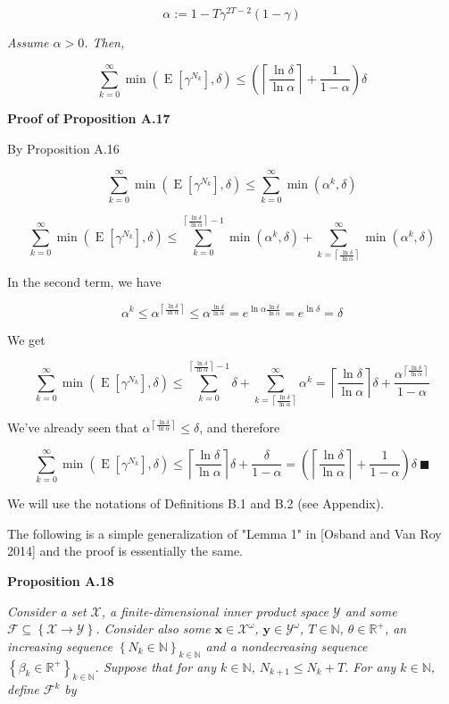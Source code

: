 \documentclass[a4paper]{article}
\newcommand{\Co}[1]{}
\newcommand{\San}[1]{}
\newcommand{\AP}[1]{\left(#1\right)}
\newcommand{\AB}[1]{\left[#1\right]}
\newcommand{\AC}[1]{\left\{#1\right\}}
\newcommand{\Ceil}[1]{\left\lceil #1 \right\rceil}
\newcommand{\E}[1]{\operatorname{E}\AB{#1}}
\newcommand{\Nats}{\mathbb{N}}
\newcommand{\Reals}{\mathbb{R}}
\newcommand{\X}{\mathcal{X}}
\newcommand{\Y}{\mathcal{Y}}
\newcommand{\F}{\mathcal{F}}
\begin{document}
$$\alpha:=1-T\gamma^{2T-2}(1-\gamma)$$

\textit{Assume $\alpha>0$. Then,}\Co{i}

$$\sum_{k=0}^\infty\min\AP{\E{\gamma^{N_k}},\delta}\leq\AP{\Ceil{\frac{\ln\delta}{\ln\alpha}}+\frac{1}{1-\alpha}}\delta$$

\textbf{Proof of Proposition A.17}\Co{b}

By Proposition A.16

$$\sum_{k=0}^\infty\min\AP{\E{\gamma^{N_k}},\delta}\leq\sum_{k=0}^\infty\min\AP{\alpha^k,\delta}$$

$$\sum_{k=0}^\infty\min\AP{\E{\gamma^{N_k}},\delta}\leq\sum_{k=0}^{\Ceil{\frac{\ln\delta}{\ln\alpha}}-1}\min\AP{\alpha^k,\delta}+\sum_{k=\Ceil{\frac{\ln\delta}{\ln\alpha}}}^\infty\min\AP{\alpha^k,\delta}$$

In the second term, we have

$$\alpha^k\leq\alpha^{\Ceil{\frac{\ln\delta}{\ln\alpha}}}\leq\alpha^{\frac{\ln\delta}{\ln\alpha}}=e^{\ln\alpha\frac{\ln\delta}{\ln\alpha}}=e^{\ln\delta}=\delta$$

We get

$$\sum_{k=0}^\infty\min\AP{\E{\gamma^{N_k}},\delta}\leq\sum_{k=0}^{\Ceil{\frac{\ln\delta}{\ln\alpha}}-1}\delta+\sum_{k=\Ceil{\frac{\ln\delta}{\ln\alpha}}}^\infty\alpha^k=\Ceil{\frac{\ln\delta}{\ln\alpha}}\delta+\frac{\alpha^{\Ceil{\frac{\ln\delta}{\ln\alpha}}}}{1-\alpha}$$

We've already seen that $\alpha^{\Ceil{\frac{\ln\delta}{\ln\alpha}}}\leq\delta$, and therefore

$$\sum_{k=0}^\infty\min\AP{\E{\gamma^{N_k}},\delta}\leq\Ceil{\frac{\ln\delta}{\ln\alpha}}\delta+\frac{\delta}{1-\alpha}=\AP{\Ceil{\frac{\ln\delta}{\ln\alpha}}+\frac{1}{1-\alpha}}\delta\ \blacksquare$$

We will use the notations of Definitions B.1 and B.2 (see Appendix).

The following is a simple generalization of "Lemma 1" in [Osband and Van Roy 2014]\San{(https://arxiv.org/abs/1406.1853)} and the proof is essentially the same.

\textbf{Proposition A.18}\Co{b}

\textit{Consider a set $\X$, a finite-dimensional inner product space $\Y$ and some $\F\subseteq\AC{\X\rightarrow\Y}$. Consider also some $\boldsymbol{x}\in\X^\omega$, $\boldsymbol{y}\in\Y^\omega$, $T\in\Nats$, $\theta\in\Reals^+$, an increasing sequence $\AC{N_k\in\Nats}_{k\in\Nats}$ and a nondecreasing sequence $\AC{\beta_k\in\Reals^+}_{k\in\Nats}$. Suppose that for any $k\in\Nats$, $N_{k+1}\leq N_k+T$. For any $k\in\Nats$, define $\F^k$ by}\Co{i}
\end{document}
